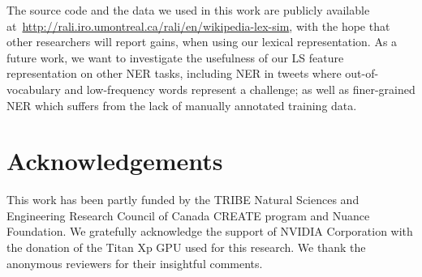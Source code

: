 \documentclass[11pt]{article}
\newcommand{\lr}{\textsc{LS}}
\begin{document}
	The source code and the data we used in this work are publicly available at~\url{http://rali.iro.umontreal.ca/rali/en/wikipedia-lex-sim}, with the hope that other researchers will report gains, when using our lexical representation.	As a future work, we want to investigate the usefulness of our \lr{} feature representation on other NER tasks, including NER in tweets where  out-of-vocabulary and low-frequency words represent a challenge; as well as finer-grained NER which suffers  from the lack of manually annotated training data. 
	
	\section*{Acknowledgements}
	This work has been partly funded by the TRIBE Natural Sciences and Engineering Research Council of Canada CREATE program and Nuance Foundation. We gratefully acknowledge the support of NVIDIA Corporation with the donation of the Titan Xp GPU used for this research. We thank the anonymous reviewers for their insightful comments.
	

	
	
	
\end{document}
